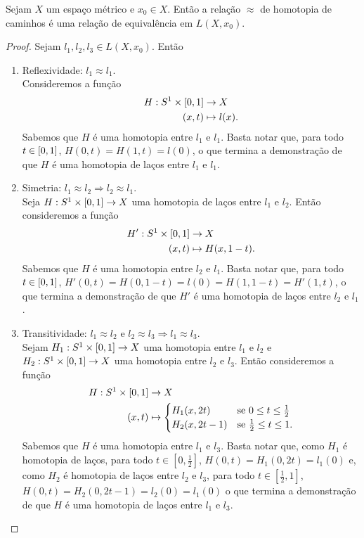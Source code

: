 \begin{proposition}
	Sejam $X$ um espaço métrico e $x_0 \in X$. Então a relação $\approx$ de homotopia de caminhos é uma relação de equivalência em $L(X,x_0)$.
\end{proposition}
\begin{proof} Sejam $l_1,l_2,l_3 \in L(X,x_0)$. Então
	\begin{enumerate}
	\item Reflexividade: $l_1 \approx l_1$. \\
	Consideremos a função
		\begin{align*}
		H: S^1 \times \left[{0},{1}\right] &\to X \\
		(x,t) &\mapsto l(x).
		\end{align*}
Sabemos que $H$ é uma homotopia entre $l_1$ e $l_1$. Basta notar que, para todo $t \in \left[{0},{1}\right]$, $H(0,t)=H(1,t)=l(0)$, o que termina a demonstração de que $H$ é uma homotopia de laços entre $l_1$ e $l_1$.
	
	\item Simetria: $l_1 \approx l_2 \Rightarrow l_2 \approx l_1$. \\
	Seja $H: S^1 \times \left[{0},{1}\right] \to X$ uma homotopia de laços entre $l_1$ e $l_2$. Então consideremos a função
	\begin{align*}
	H': S^1 \times \left[{0},{1}\right] &\to X \\
		(x,t) &\mapsto H(x,1-t).
	\end{align*}		
Sabemos que $H$ é uma homotopia entre $l_2$ e $l_1$. Basta notar que, para todo $t \in \left[{0},{1}\right]$, $H'(0,t)=H(0,1-t)=l(0)=H(1,1-t)=H'(1,t)$, o que termina a demonstração de que $H'$ é uma homotopia de laços entre $l_2$ e $l_1$.

	\item Transitividade: $l_1 \approx l_2 \text{\ \ e\ \ } l_2 \approx l_3 \Rightarrow l_1 \approx l_3$. \\
	Sejam $H_1: S^1 \times \left[{0},{1}\right] \to X$ uma homotopia entre $l_1$ e $l_2$ e $H_2: S^1 \times \left[{0},{1}\right] \to X$ uma homotopia entre $l_2$ e $l_3$. Então consideremos a função
	\begin{align*}
	H: S^1 \times \left[{0},{1}\right] &\to X \\
		(x,t) &\mapsto \begin{cases}
						H_1(x,2t) &\text{se $0 \leq t \leq \frac{1}{2}$}\\
						H_2(x,2t-1) &\text{se $\frac{1}{2} \leq t \leq 1$}.
						\end{cases}
	\end{align*}
Sabemos que $H$ é uma homotopia entre $l_1$ e $l_3$. Basta notar que, como $H_1$ é homotopia de laços, para todo $t \in [0,\frac{1}{2}]$, $H(0,t)=H_1(0,2t)=l_1(0)$ e, como $H_2$ é homotopia de laços entre $l_2$ e $l_3$, para todo $t \in [\frac{1}{2},1]$, $H(0,t)=H_2(0,2t-1)=l_2(0)=l_1(0)$ o que termina a demonstração de que $H$ é uma homotopia de laços entre $l_1$ e $l_3$. 
	\end{enumerate}
\end{proof}

